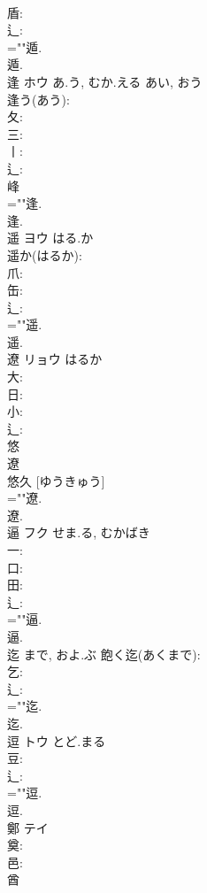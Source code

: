 \documentclass[8pt]{extreport}
\begin{document}
\begin{CJK}{UTF8}{min}
\\	盾: 
\\	辶: 
\\	=""遁.
\\	遁.
\\	逢	ホウ	あ.う, むか.える	あい, おう	
\\	逢う(あう): 
\\	夂: 
\\	三: 
\\	丨: 
\\	辶: 
\\	峰 
\\	=""逢.
\\	逢.
\\	遥	ヨウ	はる.か		
\\	遥か(はるか): 
\\	爪: 
\\	缶: 
\\	辶: 
\\	=""遥.
\\	遥.
\\	遼	リョウ		はるか	
\\	大: 
\\	日: 
\\	小: 
\\	辶: 
\\	悠 
\\	遼 
\\	悠久 [ゆうきゅう] 
\\	=""遼.
\\	遼.
\\	逼	フク	せま.る, むかばき		
\\	一: 
\\	口: 
\\	田: 
\\	辶: 
\\	=""逼.
\\	逼.
\\	迄		まで, およ.ぶ			飽く迄(あくまで): 
\\	乞: 
\\	辶: 
\\	=""迄.
\\	迄.
\\	逗	トウ	とど.まる		
\\	豆: 
\\	辶: 
\\	=""逗.
\\	逗.
\\	鄭	テイ			
\\	奠: 
\\	邑: 
\\	酋 

\end{CJK}
\end{document}
